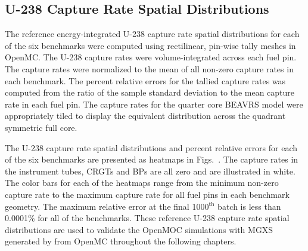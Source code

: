 
\clearpage

\subsection{U-238 Capture Rate Spatial Distributions}
\label{subsec:chap7-capture-rates}

The reference energy-integrated U-238 capture rate spatial distributions for each of the six benchmarks were computed using rectilinear, pin-wise tally meshes in OpenMC. The U-238 capture rates were volume-integrated across each fuel pin. The capture rates were normalized to the mean of all non-zero capture rates in each benchmark. The percent relative errors for the tallied capture rates was computed from the ratio of the sample standard deviation to the mean capture rate in each fuel pin. The capture rates for the quarter core \ac{BEAVRS} model were appropriately tiled to display the equivalent distribution across the quadrant symmetric full core.

The U-238 capture rate spatial distributions and percent relative errors for each of the six benchmarks are presented as heatmaps in Figs.~. The capture rates in the instrument tubes, \acp{CRGT} and \acp{BP} are all zero and are illustrated in white. The color bars for each of the heatmaps range from the minimum non-zero capture rate to the maximum capture rate for all fuel pins in each benchmark geometry. The maximum relative error at the final 1000$^{\text{th}}$ batch is less than 0.0001\% for all of the benchmarks. These reference U-238 capture rate spatial distributions are used to validate the OpenMOC simulations with \ac{MGXS} generated by from OpenMC throughout the following chapters.


